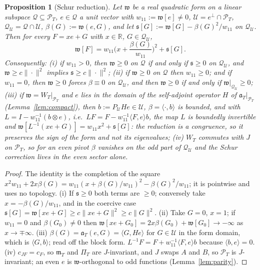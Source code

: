 \documentclass[11pt]{amsart}
\newtheorem{proposition}[theorem]{Proposition}
\theoremstyle{definition}
\theoremstyle{remark}
\newcommand{\R}{\mathbb R}
\newcommand{\PT}{\mathcal P_T}
\newcommand{\cF}{c_F}
\newcommand{\PiT}{\Pi_T}
\newcommand{\mT}{\mathfrak m_T}
\begin{document}
\begin{proposition}[Schur reduction]\label{prop:schur}
Let $\mathfrak w$ be a real quadratic form on a linear subspace $\mathcal Q\subseteq\PT$, $e\in\mathcal Q$ a unit vector with
$w_{11}:=\mathfrak w[e]\ne0$, $\mathcal U=e^\perp\cap\PT$, $\mathcal Q_{\mathcal U}=\mathcal Q\cap\mathcal U$, $\beta(G):=\mathfrak w(e,G)$, and let
$\mathfrak s[G]:=\mathfrak w[G]-\beta(G)^2/w_{11}$ on $\mathcal Q_{\mathcal U}$. Then for every $F=xe+G$ with $x\in\R$, $G\in\mathcal Q_{\mathcal U}$,
\[
\mathfrak w[F]=w_{11}\Big(x+\frac{\beta(G)}{w_{11}}\Big)^2+\mathfrak s[G].
\]
Consequently:
\emph{(i)} if $w_{11}>0$, then $\mathfrak w\ge0$ on $\mathcal Q$ if and only if $\mathfrak s\ge0$ on $\mathcal Q_{\mathcal U}$, and $\mathfrak w\ge c\|\cdot\|^2$
implies $\mathfrak s\ge c\|\cdot\|^2$;
\emph{(ii)} if $\mathfrak w\ge0$ on $\mathcal Q$ then $w_{11}\ge0$; and if $w_{11}=0$, then $\mathfrak w\ge0$ forces $\beta\equiv0$ on
$\mathcal Q_{\mathcal U}$, and then $\mathfrak w\ge0$ if and only if $\mathfrak w|_{\mathcal Q_{\mathcal U}}\ge0$;
\emph{(iii)} if $\mathfrak w=W_T|_{\PT}$ and $e$ lies in the domain of the self-adjoint operator $H$ of $\mathfrak a_T|_{\PT}$
(Lemma~\ref{lem:compact}), then $b:=P_{\mathcal U}He\in\mathcal U$, $\beta=\langle\cdot,b\rangle$ is bounded, and with
$L=I-w_{11}^{-1}(b\otimes e)$, i.e.\ $LF=F-w_{11}^{-1}\langle F,e\rangle b$, the map $L$ is boundedly invertible and
$\mathfrak w[L^{-1}(xe+G)]=w_{11}x^2+\mathfrak s[G]$: the reduction is a congruence, so it preserves the sign of the form
and not its eigenvalues;
\emph{(iv)} $W_T$ commutes with $J$ on $\PT$, so for an even pivot $\beta$ vanishes on the odd part of
$\mathcal Q_{\mathcal U}$ and the Schur correction lives in the even sector alone.
\end{proposition}
\begin{proof}
The identity is the completion of the square
$x^2w_{11}+2x\beta(G)=w_{11}(x+\beta(G)/w_{11})^2-\beta(G)^2/w_{11}$; it is pointwise and uses no topology.
(i) If $\mathfrak s\ge0$ both terms are $\ge0$; conversely take $x=-\beta(G)/w_{11}$, and in the coercive case
$\mathfrak s[G]=\mathfrak w[xe+G]\ge c\|xe+G\|^2\ge c\|G\|^2$. (ii) Take $G=0$, $x=1$; if $w_{11}=0$ and $\beta(G_0)\ne0$
then $\mathfrak w[xe+G_0]=2x\beta(G_0)+\mathfrak w[G_0]\to-\infty$ as $x\to\mp\infty$. (iii) $\beta(G)=\mathfrak a_T(e,G)=\langle G,He\rangle$
for $G\in\mathcal U$ in the form domain, which is $\langle G,b\rangle$; read off the block form. $L^{-1}F=F+w_{11}^{-1}\langle F,e\rangle b$
because $\langle b,e\rangle=0$. (iv) $c_{JF}=\cF$, so $\mT$ and $\PiT$ are $J$-invariant, and $J$ swaps $A$ and $B$, so
$\PT$ is $J$-invariant; an even $e$ is $\mathfrak w$-orthogonal to odd functions (Lemma~\ref{lem:parity}).
\end{proof}
\end{document}
